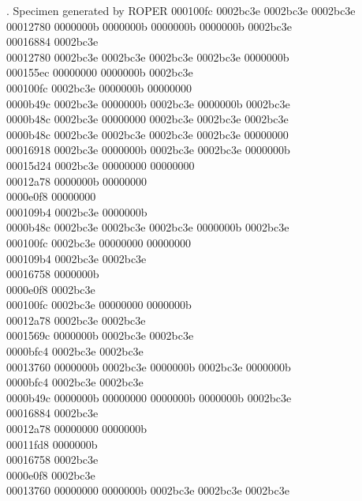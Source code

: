 \documentclass[9pt]{beamer}
\begin{document}
\begin{frame}{\theframenumber. Specimen generated by ROPER}
000100fc 0002bc3e 0002bc3e 0002bc3e \\
00012780 0000000b 0000000b 0000000b 0000000b 0002bc3e \\
00016884 0002bc3e \\
00012780 0002bc3e 0002bc3e 0002bc3e 0002bc3e 0000000b \\
000155ec 00000000 0000000b 0002bc3e \\
000100fc 0002bc3e 0000000b 00000000 \\
0000b49c 0002bc3e 0000000b 0002bc3e 0000000b 0002bc3e \\
0000b48c 0002bc3e 00000000 0002bc3e 0002bc3e 0002bc3e \\
0000b48c 0002bc3e 0002bc3e 0002bc3e 0002bc3e 00000000 \\
00016918 0002bc3e 0000000b 0002bc3e 0002bc3e 0000000b \\
00015d24 0002bc3e 00000000 00000000 \\
00012a78 0000000b 00000000 \\
0000e0f8 00000000 \\
000109b4 0002bc3e 0000000b \\
0000b48c 0002bc3e 0002bc3e 0002bc3e 0000000b 0002bc3e \\
000100fc 0002bc3e 00000000 00000000 \\
000109b4 0002bc3e 0002bc3e \\
00016758 0000000b \\
0000e0f8 0002bc3e \\
000100fc 0002bc3e 00000000 0000000b \\
00012a78 0002bc3e 0002bc3e \\
0001569c 0000000b 0002bc3e 0002bc3e \\
0000bfc4 0002bc3e 0002bc3e \\
00013760 0000000b 0002bc3e 0000000b 0002bc3e 0000000b \\
0000bfc4 0002bc3e 0002bc3e \\
0000b49c 0000000b 00000000 0000000b 0000000b 0002bc3e \\
00016884 0002bc3e \\
00012a78 00000000 0000000b \\
00011fd8 0000000b \\
00016758 0002bc3e \\
0000e0f8 0002bc3e \\
00013760 00000000 0000000b 0002bc3e 0002bc3e 0002bc3e \\

\end{frame}
\end{document}
